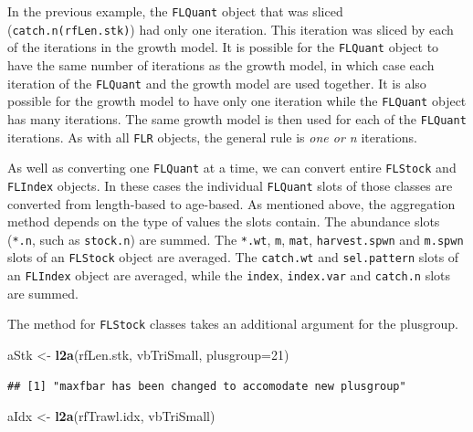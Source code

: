 \documentclass[
]{book}
\newenvironment{Shaded}{\begin{snugshade}}{\end{snugshade}}
\newcommand{\AttributeTok}[1]{\textcolor[rgb]{0.13,0.29,0.53}{#1}}
\newcommand{\DecValTok}[1]{\textcolor[rgb]{0.00,0.00,0.81}{#1}}
\newcommand{\FunctionTok}[1]{\textcolor[rgb]{0.13,0.29,0.53}{\textbf{#1}}}
\newcommand{\NormalTok}[1]{#1}
\newcommand{\OtherTok}[1]{\textcolor[rgb]{0.56,0.35,0.01}{#1}}
\begin{document}
In the previous example, the \texttt{FLQuant} object that was sliced (\texttt{catch.n(rfLen.stk)}) had only one iteration. This iteration was sliced by each of the iterations in the growth model. It is possible for the \texttt{FLQuant} object to have the same number of iterations as the growth model, in which case each iteration of the \texttt{FLQuant} and the growth model are used together. It is also possible for the growth model to have only one iteration while the \texttt{FLQuant} object has many iterations. The same growth model is then used for each of the \texttt{FLQuant} iterations. As with all \texttt{FLR} objects, the general rule is \emph{one or n} iterations.

As well as converting one \texttt{FLQuant} at a time, we can convert entire \texttt{FLStock} and \texttt{FLIndex} objects. In these cases the individual \texttt{FLQuant} slots of those classes are converted from length-based to age-based. As mentioned above, the aggregation method depends on the type of values the slots contain. The abundance slots (\texttt{*.n}, such as \texttt{stock.n}) are summed. The \texttt{*.wt}, \texttt{m}, \texttt{mat}, \texttt{harvest.spwn} and \texttt{m.spwn} slots of an \texttt{FLStock} object are averaged. The \texttt{catch.wt} and \texttt{sel.pattern} slots of an \texttt{FLIndex} object are averaged, while the \texttt{index}, \texttt{index.var} and \texttt{catch.n} slots are summed.

The method for \texttt{FLStock} classes takes an additional argument for the plusgroup.

\begin{Shaded}
\begin{Highlighting}[]
\NormalTok{aStk }\OtherTok{\textless{}{-}} \FunctionTok{l2a}\NormalTok{(rfLen.stk, vbTriSmall, }\AttributeTok{plusgroup=}\DecValTok{21}\NormalTok{)}
\end{Highlighting}
\end{Shaded}

\begin{verbatim}
## [1] "maxfbar has been changed to accomodate new plusgroup"
\end{verbatim}

\begin{Shaded}
\begin{Highlighting}[]
\NormalTok{aIdx }\OtherTok{\textless{}{-}} \FunctionTok{l2a}\NormalTok{(rfTrawl.idx, vbTriSmall)}
\end{Highlighting}
\end{Shaded}
\end{document}
